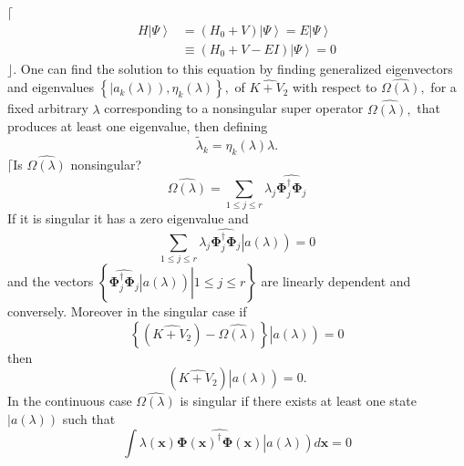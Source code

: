 \documentclass[aps,preprint]{revtex4}%
\begin{document}
$\lceil$%
\begin{align}
H\left\vert \Psi\right\rangle  &  =\left(  H_{0}+V\right)  \left\vert
\Psi\right\rangle =E\left\vert \Psi\right\rangle \nonumber\\
&  \equiv\left(  H_{0}+V-EI\right)  \left\vert \Psi\right\rangle =0
\end{align}
$\rfloor$. One can find the solution to this equation by finding generalized
eigenvectors and eigenvalues $\left\{  \left\vert a_{k}\left(  \lambda\right)
\right)  ,\eta_{k}\left(  \lambda\right)  \right\}  ,$ of $\widehat{K+V_{2}}$
with respect to $\widehat{\Omega\left(  \lambda\right)  },$ for a fixed
arbitrary $\lambda$ corresponding to a nonsingular super operator
$\widehat{\Omega\left(  \lambda\right)  ,}$ that produces at least one
eigenvalue, then defining
\begin{equation}
\tilde{\lambda}_{k}=\eta_{k}\left(  \lambda\right)  \lambda.
\end{equation}
$\lceil$Is $\widehat{\Omega\left(  \lambda\right)  }$ nonsingular?
\begin{equation}
\widehat{\Omega\left(  \lambda\right)  }=\sum_{1\leq j\leq r}\lambda
_{j}\widehat{\mathbf{\Phi}_{j}^{\dagger}\mathbf{\Phi}_{j}}%
\end{equation}
If it is singular it has a zero eigenvalue and
\begin{equation}
\sum_{1\leq j\leq r}\lambda_{j}\widehat{\mathbf{\Phi}_{j}^{\dagger
}\mathbf{\Phi}_{j}}\left\vert \overset{}{a\left(  \lambda\right)  }\right)  =0
\end{equation}
and the vectors $\left\{  \left.  \widehat{\mathbf{\Phi}_{j}^{\dagger
}\mathbf{\Phi}_{j}}\left\vert \overset{}{a\left(  \lambda\right)  }\right)
\right\vert 1\leq j\leq r\right\}  $ are linearly dependent and conversely.
Moreover in the singular case if
\begin{equation}
\left\{  \left(  \widehat{K+V_{2}}\right)  -\widehat{\Omega\left(
\lambda\right)  }\right\}  \left\vert \overset{}{a\left(  \lambda\right)
}\right)  =0
\end{equation}
then
\begin{equation}
\left(  \widehat{K+V_{2}}\right)  \left\vert \overset{}{a\left(
\lambda\right)  }\right)  =0.
\end{equation}
In the continuous case $\widehat{\Omega\left(  \lambda\right)  }$ is singular
if there exists at least one state $\left\vert a\left(  \lambda\right)
\right)  $ such that
\begin{equation}
\int\lambda\left(  \mathbf{x}\right)  \widehat{\mathbf{\Phi}\left(
\mathbf{x}\right)  ^{\dagger}\mathbf{\Phi}\left(  \mathbf{x}\right)
}\left\vert \overset{}{a\left(  \lambda\right)  }\right)  d\mathbf{x}=0
\end{equation}
\end{document}
